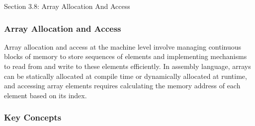 \begin{notes}{Section 3.8: Array Allocation And Access}
    \subsubsection*{Array Allocation and Access}

    Array allocation and access at the machine level involve managing continuous blocks of memory to store sequences of elements and implementing mechanisms to read from and write to these elements 
    efficiently. In assembly language, arrays can be statically allocated at compile time or dynamically allocated at runtime, and accessing array elements requires calculating the memory address of 
    each element based on its index. \vspace*{1em}
    
    \subsubsection*{Key Concepts}
    

\end{notes}
